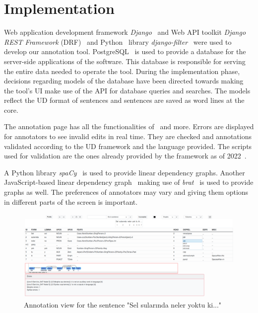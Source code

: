 \section{Implementation}
\label{sec:implementation}

Web application development framework \textit{Django}~\cite{django} and Web API toolkit \textit{Django REST Framework} (DRF)~\cite{drf} and Python~\cite{python} library \textit{django-filter}~\cite{django-filter} were used to develop our annotation tool.
PostgreSQL~\cite{psql} is used to provide a database for the server-side applications of the software.
This database is responsible for serving the entire data needed to operate the tool.
During the implementation phase, decisions regarding models of the database have been directed towards making the tool's UI make use of the API for database queries and searches.
The models reflect the UD format of sentences and sentences are saved as word lines at the core.

The annotation page has all the functionalities of \boatvone\ and more.
Errors are displayed for annotators to see invalid edits in real time.
They are checked and annotations validated according to the UD framework and the language provided.
The scripts used for validation are the ones already provided by the framework as of 2022~\cite{UD-git}.

A Python library \textit{spaCy}~\cite{spacy} is used to provide linear dependency graphs.
Another JavaScript-based linear dependency graph~\cite{spyssalo} making use of \textit{brat}~\cite{brat-vis} is used to provide graphs as well.
The preferences of annotators may vary and giving them options in different parts of the screen is important.

\begin{figure}[tbh]
    \centering
    \includegraphics[width=1\textwidth]{figures/1.png}
    \caption{Annotation view for the sentence "Sel sularında neler yoktu ki..."}
    \label{fig:demo-fig}
\end{figure}

